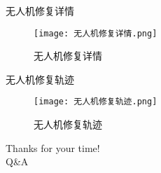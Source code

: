 \documentclass{ctexbeamer}
\begin{document}
\begin{frame}{无人机修复详情}
    \begin{figure}[!h]
        \centering
        \texttt{[image: 无人机修复详情.png]}
        \caption{无人机修复详情}
        \label{fig:my_label}
    \end{figure}
\end{frame}

\begin{frame}{无人机修复轨迹}
    \begin{figure}[!h]
        \centering
        \texttt{[image: 无人机修复轨迹.png]}
        \caption{无人机修复轨迹}
        \label{fig:my_label}
    \end{figure}
\end{frame}


\begin{frame}[plain,t]
    \vspace{100pt}
    \centering
    {\Huge Thanks for your time!\\Q\&A}
\end{frame}
\end{document}
